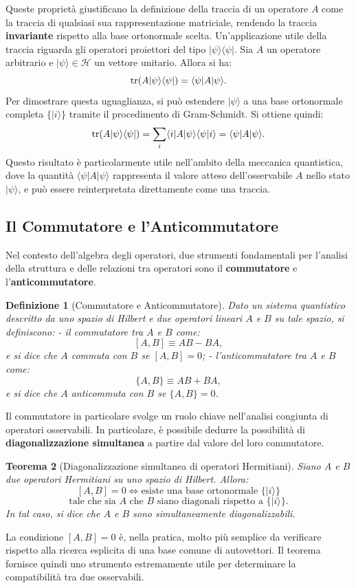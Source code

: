\documentclass[a4paper,12pt]{report}
\theoremstyle{plain}
\newtheorem{definizione}{Definizione}[section]
\newtheorem{teorema}[definizione]{Teorema}
\begin{document}
Queste proprietà giustificano la definizione della traccia di un operatore \( A \) come la traccia di qualsiasi sua rappresentazione matriciale, rendendo la traccia \textbf{invariante} rispetto alla base ortonormale scelta.
Un'applicazione utile della traccia riguarda gli operatori proiettori del tipo \( |\psi\rangle \langle\psi| \). Sia \( A \) un operatore arbitrario e \( |\psi\rangle \in \mathcal{H} \) un vettore unitario. Allora si ha:
\[
\tr(A|\psi\rangle\langle\psi|) = \langle\psi|A|\psi\rangle.
\]
Per dimostrare questa uguaglianza, si può estendere \( |\psi\rangle \) a una base ortonormale completa \( \{|i\rangle\} \) tramite il procedimento di Gram-Schmidt. Si ottiene quindi:
\[
\tr(A|\psi\rangle\langle\psi|) = \sum_i \langle i|A|\psi\rangle\langle\psi|i\rangle = \langle\psi|A|\psi\rangle.
\]
Questo risultato è particolarmente utile nell'ambito della meccanica quantistica, dove la quantità \( \langle\psi|A|\psi\rangle \) rappresenta il valore atteso dell'osservabile \( A \) nello stato \( |\psi\rangle \), e può essere reinterpretata direttamente come una traccia.

\subsection{Il Commutatore e l'Anticommutatore}
Nel contesto dell'algebra degli operatori, due strumenti fondamentali per l'analisi della struttura e delle relazioni tra operatori sono il \textbf{commutatore} e 
\newline
l'\textbf{anticommutatore}.
\begin{definizione}[Commutatore e Anticommutatore]
Dato un sistema quantistico descritto da uno spazio di Hilbert e due operatori lineari $A$ e $B$ su tale spazio, si definiscono:
- il commutatore tra $A$ e $B$ come:
  \[  [A, B] \equiv AB - BA,\]
  e si dice che $A$ \textit{commuta con $B$} se $[A, B] = 0$;
- l'anticommutatore tra $A$ e $B$ come:
  \[  \{A, B\} \equiv AB + BA,\]
  e si dice che $A$ \textit{anticommuta con $B$} se $\{A, B\} = 0$.
\end{definizione}
Il commutatore in particolare svolge un ruolo chiave nell'analisi congiunta di operatori osservabili. In particolare, è possibile dedurre la possibilità di \textbf{diagonalizzazione simultanea} a partire dal valore del loro commutatore.
\begin{teorema}[Diagonalizzazione simultanea di operatori Hermitiani]
Siano $A$ e $B$ due operatori Hermitiani su uno spazio di Hilbert. Allora:
  \[
  [A, B] = 0 \iff \text{esiste una base ortonormale } \{|i\rangle\} 
  \]
  \[
  \text{tale che sia } A \text{ che } B \text{ siano diagonali rispetto a } \{|i\rangle\}.
  \]
In tal caso, si dice che $A$ e $B$ sono simultaneamente diagonalizzabili.
\end{teorema}
La condizione $[A, B] = 0$ è, nella pratica, molto più semplice da verificare rispetto alla ricerca esplicita di una base comune di autovettori. Il teorema fornisce quindi uno strumento estremamente utile per determinare la compatibilità tra due osservabili.
\end{document}
